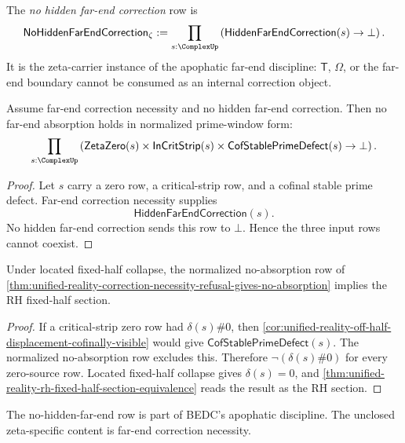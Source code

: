 \begin{definition}
\label{def:unified-reality-no-hidden-far-end-correction}
The \emph{no hidden far-end correction} row is
$$
\mathsf{NoHiddenFarEndCorrection}_{\zeta}
:=
\prod_{s:\ComplexUp}
\left(
\mathsf{HiddenFarEndCorrection}(s)\to\bot
\right).
$$
It is the zeta-carrier instance of the apophatic far-end discipline:
$\mathsf{T}$, $\Omega$, or the far-end boundary cannot be consumed as an
internal correction object.
\end{definition}

\begin{theorem}
\label{thm:unified-reality-correction-necessity-refusal-gives-no-absorption}
Assume far-end correction necessity and no hidden far-end correction.
Then no far-end absorption holds in normalized prime-window form:
$$
\prod_{s:\ComplexUp}
\left(
\mathsf{ZetaZero}(s)
\times
\mathsf{InCritStrip}(s)
\times
\mathsf{CofStablePrimeDefect}(s)
\to
\bot
\right).
$$
\end{theorem}

\begin{proof}
Let $s$ carry a zero row, a critical-strip row, and a cofinal stable
prime defect.  Far-end correction necessity supplies
$$
\mathsf{HiddenFarEndCorrection}(s).
$$
No hidden far-end correction sends this row to $\bot$.  Hence the three
input rows cannot coexist.
\end{proof}

\begin{corollary}
\label{cor:unified-reality-no-absorption-gives-rh-section-normalized}
Under located fixed-half collapse, the normalized no-absorption row of
\autoref{thm:unified-reality-correction-necessity-refusal-gives-no-absorption}
implies the RH fixed-half section.
\end{corollary}

\begin{proof}
If a critical-strip zero row had $\delta(s)\#0$, then
\autoref{cor:unified-reality-off-half-displacement-cofinally-visible}
would give $\mathsf{CofStablePrimeDefect}(s)$.  The normalized
no-absorption row excludes this.  Therefore $\neg(\delta(s)\#0)$ for
every zero-source row.  Located fixed-half collapse gives
$\delta(s)=0$, and
\autoref{thm:unified-reality-rh-fixed-half-section-equivalence} reads
the result as the RH section.
\end{proof}

\begin{theorem}
\label{thm:unified-reality-correction-necessity-unclosed-exactness-step}
The no-hidden-far-end row is part of BEDC's apophatic discipline.  The
unclosed zeta-specific content is far-end correction necessity.
\end{theorem}

